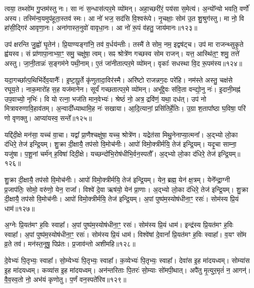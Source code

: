 त्वया॒ तथ्सो॑म गु॒प्तम॑स्तु नः।
सा नः॑ स॒न्धास॑त्पर॒मे व्यो॑मन्।
अहा॒च्छरी॑रं॒ पय॑सा स॒मेत्य॑।
अ॒न्यो᳚न्यो भवति॒ वर्णो॑ अस्य।
तस्मि॑न्व॒यमुप॑हूता॒स्तव॑ स्मः।
आ नो॑ भज॒ सद॑सि वि॒श्वरू॑पे।
नृ॒चक्षाः॒ सोम॑ उ॒त शु॒श्रुग॑स्तु।
मा नो॒ वि हा॑सी॒द्गिर॑ आवृणा॒नः।
अना॑गास्त॒नुवो॑ वावृधा॒नः।
आ नो॑ रू॒पं व॑हतु॒ जाय॑मानः॥१२३॥

उप॑ क्षरन्ति जु॒ह्वो॑ घृ॒तेन॑।
प्रि॒याण्यङ्गा॑नि॒ तव॑ व॒र्धय॑न्तीः।
तस्मै॑ ते सोम॒ नम॒ इद्वष॑ट्च।
उप॑ मा राजन्थ्सुकृ॒ते ह्व॑यस्व।
सं प्रा॑णापा॒नाभ्या॒ꣳ॒ समु॒ चक्षु॑षा॒ त्वम्।
सꣴ श्रोत्रे॑ण गच्छस्व सोम राजन्।
यत्त॒ आस्थि॑त॒ꣳ॒ शमु॒ तत्ते॑ अस्तु।
जा॒नी॒तान्नः॑ स॒ङ्गम॑ने पथी॒नाम्।
ए॒तं जा॑नीतात्पर॒मे व्यो॑मन्।
वृकाः᳚ सधस्था वि॒द रू॒पम॑स्य॥१२४॥

यदा॒गच्छा᳚त्प॒थिभि॑र्देव॒यानैः᳚।
इ॒ष्टा॒पू॒र्ते कृ॑णुतादा॒विर॑स्मै।
अरि॑ष्टो राजन्नग॒दः परे॑हि।
नम॑स्ते अस्तु॒ चक्ष॑से रघूय॒ते।
नाक॒मारो॑ह स॒ह यज॑मानेन।
सूर्यं॑ गच्छतात्पर॒मे व्यो॑मन्।
अभू᳚द्दे॒वः स॑वि॒ता वन्द्यो॒नु नः॑।
इ॒दानी॒मह्न॑ उप॒वाच्यो॒ नृभिः॑।
वि यो रत्ना॒ भज॑ति मान॒वेभ्यः॑।
श्रेष्ठं॑ नो॒ अत्र॒ द्रवि॑णं॒ यथा॒ दध॑त्।
उप॑ नो मित्रावरुणावि॒हाव॑तम्।
अ॒न्वादी᳚ध्याथामि॒ह नः॑ सखाया।
आ॒दि॒त्यानां॒ प्रसि॑तिर्\mbox{}हे॒तिः।
उ॒ग्रा श॒तापा᳚ष्ठा घ॒विषा॒ परि॑ णो वृणक्तु।
आप्या॑यस्व॒ सन्ते᳚॥१२५॥\anuvakamend[त्मना॒ जाय॑मानो\-ऽस्य॒ दध॒त्पञ्च॑ च]

यद्दि॑दी॒क्षे मन॑सा॒ यच्च॑ वा॒चा।
यद्वा᳚ प्रा॒णैश्चक्षु॑षा॒ यच्च॒ श्रोत्रे॑ण।
यद्रेत॑सा मिथु॒नेनाप्या॒त्मना᳚।
अ॒द्भ्यो लो॒का द॑धिरे॒ तेज॑ इन्द्रि॒यम्।
शु॒क्रा दी॒क्षायै॒ तप॑सो वि॒मोच॑नीः।
आपो॑ विमो॒क्त्रीर्मयि॒ तेज॑ इन्द्रि॒यम्।
यदृ॒चा साम्ना॒ यजु॑षा।
प॒शू॒नां चर्म॑न् ह॒विषा॑ दिदी॒क्षे।
यच्छन्दो॑भि॒रोष॑धीभि॒र्वन॒स्पतौ᳚।
अ॒द्भ्यो लो॒का द॑धिरे॒ तेज॑ इन्द्रि॒यम्॥१२६॥

शु॒क्रा दी॒क्षायै॒ तप॑सो वि॒मोच॑नीः।
आपो॑ विमो॒क्त्रीर्मयि॒ तेज॑ इन्द्रि॒यम्।
येन॒ ब्रह्म॒ येन॑ क्ष॒त्रम्।
येने᳚न्द्रा॒ग्नी प्र॒जा\-प॑तिः॒ सोमो॒ वरु॑णो॒ येन॒ राजा᳚।
विश्वे॑ दे॒वा ऋष॑यो॒ येन॑ प्रा॒णाः।
अ॒द्भ्यो लो॒का द॑धिरे॒ तेज॑ इन्द्रि॒यम्।
शु॒क्रा दी॒क्षायै॒ तप॑सो वि॒मोच॑नीः।
आपो॑ विमो॒क्त्रीर्मयि॒ तेज॑ इन्द्रि॒यम्।
अ॒पां पुष्प॑म॒स्योष॑धीना॒ꣳ॒ रसः॑।
सोम॑स्य प्रि॒यं धाम॑॥१२७॥

अ॒ग्नेः प्रि॒यत॑मꣳ ह॒विः स्वाहा᳚।
अ॒पां पुष्प॑म॒स्योष॑धीना॒ꣳ॒ रसः॑।
सोम॑स्य प्रि॒यं धाम॑।
इन्द्र॑स्य प्रि॒यत॑मꣳ ह॒विः स्वाहा᳚।
अ॒पां पुष्प॑म॒स्योष॑धीना॒ꣳ॒ रसः॑।
सोम॑स्य प्रि॒यं धाम॑।
विश्वे॑षां दे॒वानां᳚ प्रि॒यत॑मꣳ ह॒विः स्वाहा᳚।
व॒यꣳ सो॑म व्र॒ते तव॑।
मन॑स्त॒नूषु॒ पिप्र॑तः।
प्र॒जाव॑न्तो अशीमहि॥१२८॥

दे॒वेभ्यः॑ पि॒तृभ्यः॒ स्वाहा᳚।
सो॒म्येभ्यः॑ पि॒तृभ्यः॒ स्वाहा᳚।
क॒व्येभ्यः॑ पि॒तृभ्यः॒ स्वाहा᳚।
देवा॑स इ॒ह मा॑दयध्वम्।
सोम्या॑स इ॒ह मा॑दयध्वम्।
कव्या॑स इ॒ह मा॑दयध्वम्।
अन॑न्तरिताः पि॒तरः॑ सो॒म्याः सो॑मपी॒थात्।
अपै॑तु मृ॒त्युर॒मृतं॑ न॒ आगन्॑।
वै॒व॒स्व॒तो नो॒ अभ॑यं कृणोतु।
प॒र्णं वन॒स्पते॑रिव॥१२९॥

